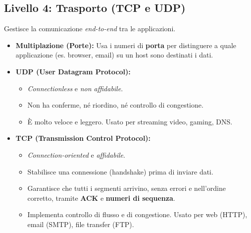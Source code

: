 \documentclass[../main.tex]{subfiles}
\begin{document}
\subsection{Livello 4: Trasporto (TCP e UDP)}
Gestisce la comunicazione \emph{end-to-end} tra le applicazioni.
\begin{itemize}
    \item \textbf{Multiplazione (Porte):} Usa i numeri di \textbf{porta} per distinguere a quale applicazione (es. browser, email) su un host sono destinati i dati.
    \item \textbf{UDP (User Datagram Protocol):}
    \begin{itemize}
        \item \emph{Connectionless} e \emph{non affidabile}.
        \item Non ha conferme, né riordino, né controllo di congestione.
        \item È molto veloce e leggero. Usato per streaming video, gaming, DNS.
    \end{itemize}
    \item \textbf{TCP (Transmission Control Protocol):}
    \begin{itemize}
        \item \emph{Connection-oriented} e \emph{affidabile}.
        \item Stabilisce una connessione (handshake) prima di inviare dati.
        \item Garantisce che tutti i segmenti arrivino, senza errori e nell'ordine corretto, tramite \textbf{ACK} e \textbf{numeri di sequenza}.
        \item Implementa controllo di flusso e di congestione. Usato per web (HTTP), email (SMTP), file transfer (FTP).
    \end{itemize}
\end{itemize}
\end{document}
